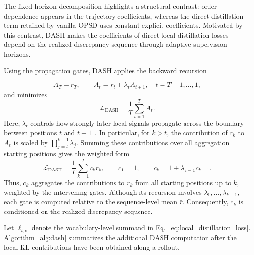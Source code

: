 \documentclass[letterpaper]{article} %
\begin{document}
The fixed-horizon decomposition highlights a structural contrast:
order dependence appears in the trajectory coefficients, whereas the
direct distillation term retained by vanilla OPSD uses constant
explicit coefficients. Motivated by this contrast, DASH makes the
coefficients of direct local distillation losses depend on the realized
discrepancy sequence through adaptive supervision horizons.


Using the propagation gates, DASH applies the backward recursion~\cite{sutton1988td,schulman2016gae}

\begin{equation}
    A_T=r_T,
    \qquad
    A_t=r_t+\lambda_tA_{t+1},
    \quad
    t=T-1,\ldots,1,
    \label{eq:dash_recursion}
\end{equation}
and minimizes
\begin{equation}
    \mathcal L_{\mathrm{DASH}}
    =
    \frac{1}{T}\sum_{t=1}^{T}A_t.
    \label{eq:dash_objective}
\end{equation}
Here, $\lambda_t$ controls how strongly later local signals propagate
across the boundary between positions $t$ and $t+1$~\cite{hochreiter1997lstm,cho2014gru}. In particular, for
$k>t$, the contribution of $r_k$ to $A_t$ is scaled by
$\prod_{j=t}^{k-1}\lambda_j$. Summing these contributions over all
aggregation starting positions gives the weighted form
\begin{equation}
    \mathcal L_{\mathrm{DASH}}
    =
    \frac{1}{T}\sum_{k=1}^{T}c_kr_k,
    \qquad
    c_1=1,
    \qquad
    c_k=1+\lambda_{k-1}c_{k-1}.
    \label{eq:dash_weighted_objective}
\end{equation}
Thus, $c_k$ aggregates the contributions to $r_k$ from all starting
positions up to $k$, weighted by the intervening gates. Although its
recursion involves $\lambda_1,\ldots,\lambda_{k-1}$, each gate is
computed relative to the sequence-level mean $\bar r$. Consequently,
$c_k$ is conditioned on the realized discrepancy sequence.

Let $\ell_{t,v}$ denote the vocabulary-level summand in Eq.~\eqref{eq:local_distillation_loss}. Algorithm~\ref{alg:dash} summarizes the additional DASH computation after the local KL contributions have been obtained along a rollout.
\end{document}
